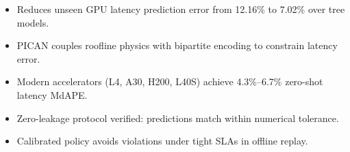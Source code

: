
\begin{itemize}
    \item Reduces unseen GPU latency prediction error from 12.16\% to 7.02\% over tree models.
    \item PICAN couples roofline physics with bipartite encoding to constrain latency error.
    \item Modern accelerators (L4, A30, H200, L40S) achieve 4.3\%--6.7\% zero-shot latency MdAPE.
    \item Zero-leakage protocol verified: predictions match within numerical tolerance.
    \item Calibrated policy avoids violations under tight SLAs in offline replay.
\end{itemize}
